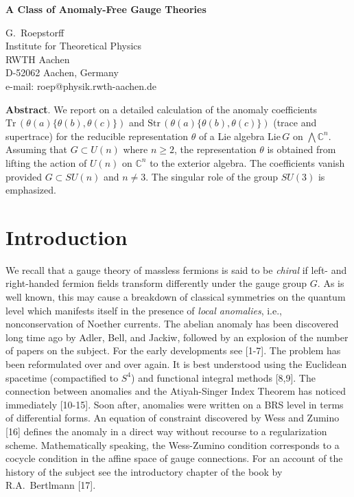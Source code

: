 \documentclass[11pt,a4paper]{article}
\newcommand{\CC}{\mathbb{C}}
\newcommand{\bw}{{\textstyle\bigwedge}}
\newcommand{\ah}{\theta(a)}
\newcommand{\bh}{\theta(b)}
\newcommand{\ch}{\theta(c)}
\newcommand{\Tr}{\mbox{Tr}\,}
\newcommand{\Str}{\mbox{Str}\,}
\begin{document}
\begin{center}
\LARGE\bf A Class of Anomaly-Free Gauge Theories
\end{center}
\vspace{3mm}
\begin{center}\large 
       G.\ Roepstorff\\
       Institute for Theoretical Physics\\
       RWTH Aachen\\
       D-52062 Aachen, Germany\\
       e-mail: roep@physik.rwth-aachen.de
\end{center}
\vspace{5mm}\par\noindent
{\bf Abstract}.
We report on a detailed calculation of the anomaly coefficients 
$\Tr(\ah\{\bh,\ch\})$ and $\Str(\ah\{\bh,\ch\})$ (trace and supertrace) for 
the reducible representation $\theta$ of a Lie algebra $\mbox{Lie}\,G$ on 
$\bw\CC^n$. Assuming that $G\subset U(n)$ where $n\ge2$, the representation $\theta$ is 
obtained from lifting the action of $U(n)$ on $\CC^n$ to the exterior algebra. 
The coefficients vanish provided $G\subset SU(n)$ and $n\ne3$. The singular
role of the group $SU(3)$ is emphasized.

\section{Introduction}

We recall that a gauge theory of massless fermions is said to be 
{\em chiral\/} if left- and
right-handed fermion fields transform differently under the gauge group $G$.
As is well known, this may cause a breakdown of classical symmetries on
the quantum level which manifests itself in the presence of {\em local
anomalies}, i.e., nonconservation of Noether currents. The abelian anomaly
has been discovered long time ago by Adler, Bell, and Jackiw, followed by
an explosion of the number of papers on the subject. For the early developments
see [1-7]. The problem has been reformulated over and over again. 
It is best understood using the Euclidean spacetime (compactified to $S^4$)
and functional integral methods [8,9]. The connection between anomalies and 
the Atiyah-Singer Index Theorem has noticed immediately [10-15]. Soon after,
anomalies were written on a BRS level in terms of differential forms.
An equation of constraint discovered by Wess and Zumino [16] defines
the anomaly in a direct way without recourse to a regularization scheme.
Mathematically speaking, the Wess-Zumino condition corresponds to a
cocycle condition in the affine space of gauge connections. For an account
of the history of the subject see the introductory chapter of the book
by R.A.\ Bertlmann [17].
\end{document}
